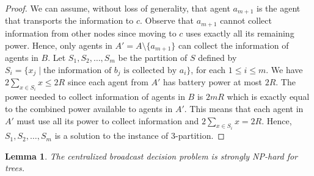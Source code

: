 \documentclass{article}
\newtheorem{lemma}{Lemma}
\begin{document}
\begin{proof}
We can assume, without loss of generality, that agent $a_{m+1}$ is the agent that transports the information to $c$. Observe that $a_{m+1}$ cannot collect information from other nodes since moving to $c$ uses exactly all its remaining power. Hence, only agents in $A'=A\setminus \{a_{m+1}\}$ can collect the information of agents in $B$. Let $S_1,S_2, \dots, S_m$ be the partition of $S$ defined by $S_i=\{x_j\mid \mbox{the information of $b_j$ is collected by $a_i$}\}$, for each $1\leq i\leq m$. We have $2\sum_{x\in S_i}x\leq 2R$ since each agent from $A'$ has battery power at most $2R$. The power needed to collect information of agents in $B$ is $2mR$ which is exactly equal to the combined power available to agents in  $A'$. This means that each agent in  $A'$ must use all its power to collect information and $2\sum_{x\in S_i}x=2R$. Hence, $S_1,S_2, \dots, S_m$ is a solution to the instance of 3-partition. 
\end{proof}


\begin{lemma}\label{th:NP-hard-graph-b}
The centralized broadcast decision problem is strongly NP-hard for trees.  
\end{lemma}
\end{document}
